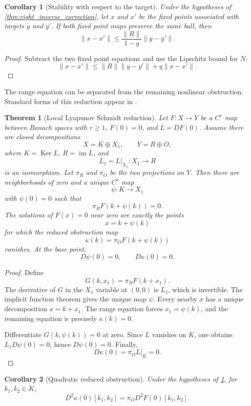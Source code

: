 \documentclass{aomart}
\newtheorem{theorem}{Theorem}[section]
\newtheorem{corollary}[corollary]{Corollary}
\theoremstyle{definition}
\theoremstyle{remark}
\newcommand{\im}{\operatorname{im}}
\newcommand{\Ker}{\operatorname{Ker}}
\begin{document}
\begin{corollary}[Stability with respect to the target]\label{cor:correction_stability}
Under the hypotheses of \cref{thm:right_inverse_correction}, let $x$ and $x'$ be the fixed points associated with targets $y$ and $y'$.  If both fixed point maps preserve the same ball, then
\[
\|x-x'\|
\le
\frac{\|R\|}{1-q}\|y-y'\|.
\]
\end{corollary}

\begin{proof}
Subtract the two fixed point equations and use the Lipschitz bound for $N$:
\[
\|x-x'\|
\le
\|R\|\|y-y'\|+q\|x-x'\|.
\]
\end{proof}

The range equation can be separated from the remaining nonlinear obstruction.  Standard forms of this reduction appear in \cite{Kielhoefer2012,Zeidler1986}.

\begin{theorem}[Local Lyapunov Schmidt reduction]\label{thm:lyapunov_schmidt}
Let $F:X\to Y$ be a $C^r$ map between Banach spaces with $r\ge1$, $F(0)=0$, and $L=DF(0)$.  Assume there are closed decompositions
\[
X=K\oplus X_1,
\qquad
Y=R\oplus O,
\]
where $K=\Ker L$, $R=\im L$, and
\[
L_1=L|_{X_1}:X_1\longrightarrow R
\]
is an isomorphism.  Let $\pi_R$ and $\pi_O$ be the two projections on $Y$.  Then there are neighborhoods of zero and a unique $C^r$ map
\[
\psi:K\longrightarrow X_1
\]
with $\psi(0)=0$ such that
\[
\pi_RF(k+\psi(k))=0.
\]
The solutions of $F(x)=0$ near zero are exactly the points
\[
x=k+\psi(k)
\]
for which the reduced obstruction map
\[
\kappa(k)=\pi_OF(k+\psi(k))
\]
vanishes.  At the base point,
\[
D\psi(0)=0,
\qquad
D\kappa(0)=0.
\]
\end{theorem}

\begin{proof}
Define
\[
G(k,x_1)=\pi_RF(k+x_1).
\]
The derivative of $G$ in the $X_1$ variable at $(0,0)$ is $L_1$, which is invertible.  The implicit function theorem gives the unique map $\psi$.  Every nearby $x$ has a unique decomposition $x=k+x_1$.  The range equation forces $x_1=\psi(k)$, and the remaining equation is precisely $\kappa(k)=0$.

Differentiate $G(k,\psi(k))=0$ at zero.  Since $L$ vanishes on $K$, one obtains $L_1D\psi(0)=0$, hence $D\psi(0)=0$.  Finally,
\[
D\kappa(0)=\pi_OL|_K=0.
\]
\end{proof}


\begin{corollary}[Quadratic reduced obstruction]\label{cor:quadratic_reduced_obstruction}
Under the hypotheses of \cref{thm:lyapunov_schmidt}, for $k_1,k_2\in K$,
\[
D^2\kappa(0)[k_1,k_2]
=
\pi_O D^2F(0)[k_1,k_2].
\]
\end{corollary}
\end{document}
